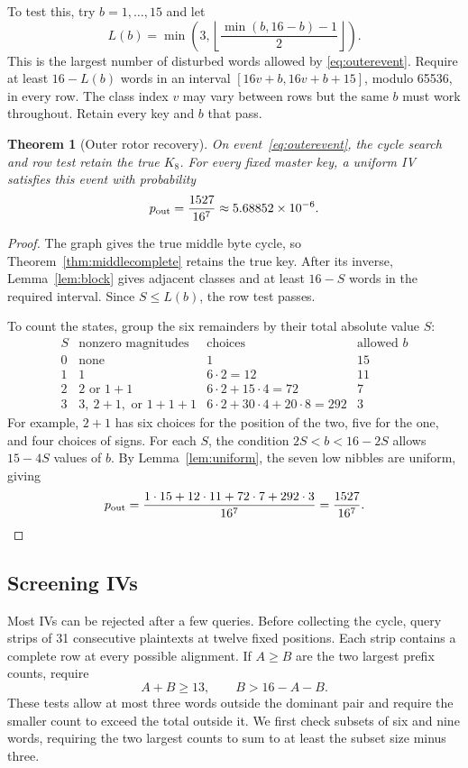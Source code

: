 \documentclass[11pt]{article}
\newtheorem{theorem}{Theorem}[section]
\begin{document}
To test this, try \(b=1,\ldots,15\) and let
\begin{equation}
 L(b)=\min\left(3,\left\lfloor
       \frac{\min(b,16-b)-1}{2}\right\rfloor\right).
 \label{eq:carrytest}
\end{equation}
This is the largest number of disturbed words allowed by
\eqref{eq:outerevent}. Require at least \(16-L(b)\) words in an interval
\([16v+b,16v+b+15]\), modulo 65536, in every row. The class index \(v\)
may vary between rows but the same \(b\) must work throughout. Retain every
key and \(b\) that pass.

\begin{theorem}[Outer rotor recovery]\label{thm:outer}
On event~\eqref{eq:outerevent}, the cycle search and row test retain the
true \(K_8\). For every fixed master key, a uniform IV satisfies this
event with probability
\begin{equation}
 p_{\rm out}=\frac{1527}{16^7}\approx5.68852\times10^{-6}.
 \label{eq:pout}
\end{equation}
\end{theorem}
\begin{proof}
The graph gives the true middle byte cycle, so
Theorem~\ref{thm:middlecomplete} retains the true key.
After its inverse, Lemma~\ref{lem:block} gives adjacent classes and
at least \(16-S\) words in the required interval. Since \(S\le L(b)\),
the row test passes.

To count the states, group the six remainders by their total
absolute value \(S\):
\[
\begin{array}{c|l|r|r}
S&\text{nonzero magnitudes}&\text{choices}&\text{allowed }b\\\hline
0&\text{none}&1&15\\
1&1&6\cdot2=12&11\\
2&2\text{ or }1+1&6\cdot2+15\cdot4=72&7\\
3&3,\ 2+1,\text{ or }1+1+1&6\cdot2+30\cdot4+20\cdot8=292&3
\end{array}
\]
For example, \(2+1\) has six choices for the position of the two,
five for the one, and four choices of signs. For each \(S\),
the condition \(2S<b<16-2S\) allows \(15-4S\) values of \(b\).
By Lemma~\ref{lem:uniform}, the seven low nibbles are uniform, giving
\[
 p_{\rm out}
 =\frac{1\cdot15+12\cdot11+72\cdot7+292\cdot3}{16^7}
 =\frac{1527}{16^7}.
\]
\end{proof}

\subsection{Screening IVs}
Most IVs can be rejected after a few queries. Before collecting the
cycle, query strips of 31 consecutive plaintexts at twelve fixed
positions. Each strip contains a complete row at every possible
alignment. If \(A\ge B\) are the two largest prefix counts, require
\[
 A+B\ge13,\qquad B>16-A-B.
\]
These tests allow at most three words outside the dominant pair and
require the smaller count to exceed the total outside it. We first
check subsets of six and nine words, requiring the two largest counts
to sum to at least the subset size minus three.
\end{document}
